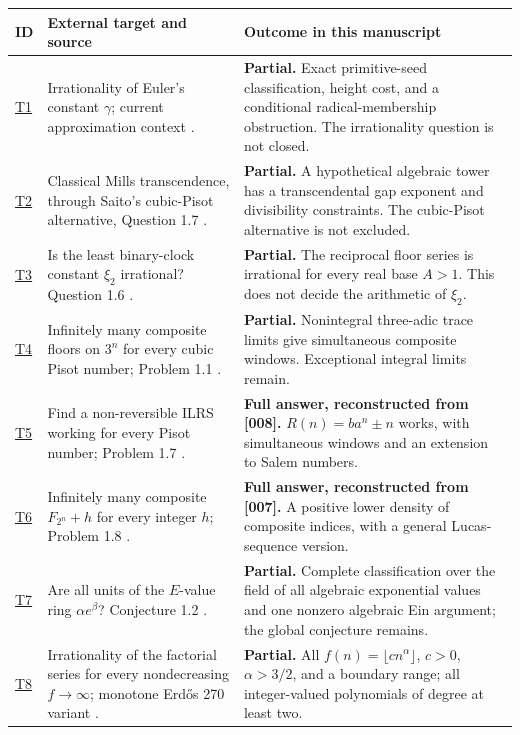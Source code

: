 \documentclass[11pt,a4paper]{article}
\numberwithin{equation}{section}
\theoremstyle{definition}
\theoremstyle{remark}
\begin{document}
\small
\begin{longtable}{@{}p{}p{}p{}@{}}
\toprule
ID & External target and source & Outcome in this manuscript\\
\midrule\endhead
\hyperref[ext:gamma]{T1} & Irrationality of Euler's constant $\gamma$; current approximation context \cite{CMF2026}. & \textbf{Partial.} Exact primitive-seed classification, height cost, and a conditional radical-membership obstruction. The irrationality question is not closed.\\[7pt]
\hyperref[exm:mills]{T2} & Classical Mills transcendence, through Saito's cubic-Pisot alternative, Question 1.7 \cite{Saito2025}. & \textbf{Partial.} A hypothetical algebraic tower has a transcendental gap exponent and divisibility constraints. The cubic-Pisot alternative is not excluded.\\[7pt]
\hyperref[exm:binary]{T3} & Is the least binary-clock constant $\xi_2$ irrational? Question 1.6 \cite{Saito2025}. & \textbf{Partial.} The reciprocal floor series is irrational for every real base $A>1$. This does not decide the arithmetic of $\xi_2$.\\[7pt]
\hyperref[exm:cubic]{T4} & Infinitely many composite floors on $3^n$ for every cubic Pisot number; Problem 1.1 \cite{SaitoIntervals}. & \textbf{Partial.} Nonintegral three-adic trace limits give simultaneous composite windows. Exceptional integral limits remain.\\[7pt]
\hyperref[exm:nonreversible]{T5} & Find a non-reversible ILRS working for every Pisot number; Problem 1.7 \cite{SaitoIntervals}. & \textbf{Full answer, reconstructed from [008].} $R(n)=ba^n\pm n$ works, with simultaneous windows and an extension to Salem numbers.\\[7pt]
\hyperref[exm:fibonacci]{T6} & Infinitely many composite $F_{2^n}+h$ for every integer $h$; Problem 1.8 \cite{SaitoIntervals}. & \textbf{Full answer, reconstructed from [007].} A positive lower density of composite indices, with a general Lucas-sequence version.\\[7pt]
\hyperref[ev:units-section]{T7} & Are all units of the $E$-value ring $\alpha e^\beta$? Conjecture 1.2 \cite{FR2026}. & \textbf{Partial.} Complete classification over the field of all algebraic exponential values and one nonzero algebraic Ein argument; the global conjecture remains.\\[7pt]
\hyperref[es:270]{T8} & Irrationality of the factorial series for every nondecreasing $f\to\infty$; monotone Erd\H{o}s 270 variant \cite{CrKo2025}. & \textbf{Partial.} All $f(n)=\lfloor cn^\alpha\rfloor$, $c>0$, $\alpha>3/2$, and a boundary range; all integer-valued polynomials of degree at least two.\\[7pt]

\end{longtable}
\end{document}

